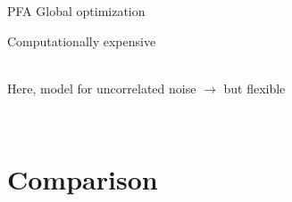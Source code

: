 \documentclass[9pt,xcolor=x11names,compress, notes=show]{beamer}%
\begin{document}
\begin{frame}{\insertsectionhead}
\begin{itemize}
	\end{itemize}
		
	\begin{block}{PFA}
		 Global optimization \hfill\parbox{0.5\linewidth}{ Computationally expensive}\\
		 Here, model for uncorrelated noise $\bm{\rightarrow}$  but flexible
	\end{block}~\\
	
	
\end{frame}

\section{Comparison}
\begin{frame}
\end{frame}
\end{document}
